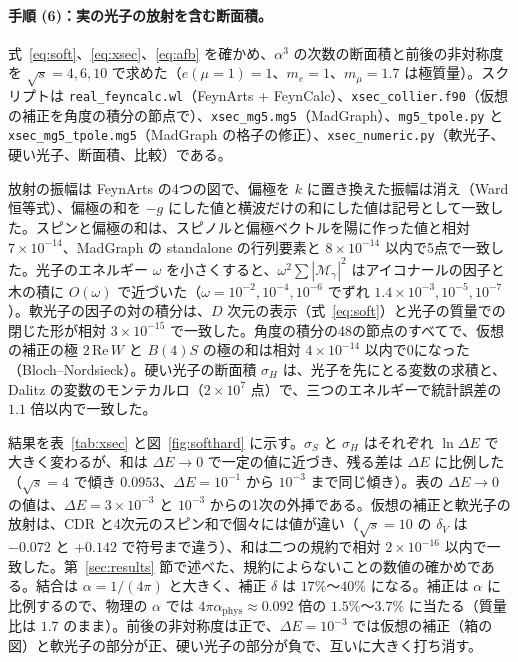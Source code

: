 \documentclass[a4paper,10pt]{ltjsarticle}
\begin{document}
\paragraph{手順 (6)：実の光子の放射を含む断面積。}式~\eqref{eq:soft}、\eqref{eq:xsec}、\eqref{eq:afb} を確かめ、$\alpha^3$ の次数の断面積と前後の非対称度を $\sqrt s=4,6,10$ で求めた（$e(\mu=1)=1$、$m_e=1$、$m_\mu=1.7$ は極質量）。スクリプトは \texttt{real\_feyncalc.wl}（FeynArts + FeynCalc）、\texttt{xsec\_collier.f90}（仮想の補正を角度の積分の節点で）、\texttt{xsec\_mg5.mg5}（MadGraph）、\texttt{mg5\_tpole.py} と \texttt{xsec\_mg5\_tpole.mg5}（MadGraph の格子の修正）、\texttt{xsec\_numeric.py}（軟光子、硬い光子、断面積、比較）である。

放射の振幅は FeynArts の4つの図で、偏極を $k$ に置き換えた振幅は消え（Ward 恒等式）、偏極の和を $-g$ にした値と横波だけの和にした値は記号として一致した。スピンと偏極の和は、スピノルと偏極ベクトルを陽に作った値と相対 $7\times10^{-14}$、MadGraph の standalone の行列要素と $8\times10^{-14}$ 以内で5点で一致した。光子のエネルギー $\omega$ を小さくすると、$\omega^2\sum|\mathcal M_\gamma|^2$ はアイコナールの因子と木の積に $O(\omega)$ で近づいた（$\omega=10^{-2},10^{-4},10^{-6}$ でずれ $1.4\times10^{-3},10^{-5},10^{-7}$）。軟光子の因子の対の積分は、$D$ 次元の表示（式~\eqref{eq:soft}）と光子の質量での閉じた形が相対 $3\times10^{-15}$ で一致した。角度の積分の48の節点のすべてで、仮想の補正の極 $2\,\mathrm{Re}\,W$ と $B(4)S$ の極の和は相対 $4\times10^{-14}$ 以内で0になった（Bloch--Nordsieck）。硬い光子の断面積 $\sigma_H$ は、光子を先にとる変数の求積と、Dalitz の変数のモンテカルロ（$2\times10^7$ 点）で、三つのエネルギーで統計誤差の $1.1$ 倍以内で一致した。

結果を表~\ref{tab:xsec} と図~\ref{fig:softhard} に示す。$\sigma_S$ と $\sigma_H$ はそれぞれ $\ln\Delta E$ で大きく変わるが、和は $\Delta E\to0$ で一定の値に近づき、残る差は $\Delta E$ に比例した（$\sqrt s=4$ で傾き $0.0953$、$\Delta E=10^{-1}$ から $10^{-3}$ まで同じ傾き）。表の $\Delta E\to0$ の値は、$\Delta E=3\times10^{-3}$ と $10^{-3}$ からの1次の外挿である。仮想の補正と軟光子の放射は、CDR と4次元のスピン和で個々には値が違い（$\sqrt s=10$ の $\delta_V$ は $-0.072$ と $+0.142$ で符号まで違う）、和は二つの規約で相対 $2\times10^{-16}$ 以内で一致した。第~\ref{sec:results} 節で述べた、規約によらないことの数値の確かめである。結合は $\alpha=1/(4\pi)$ と大きく、補正 $\delta$ は $17\%$〜$40\%$ になる。補正は $\alpha$ に比例するので、物理の $\alpha$ では $4\pi\alpha_{\mathrm{phys}}\approx0.092$ 倍の $1.5\%$〜$3.7\%$ に当たる（質量比は $1.7$ のまま）。前後の非対称度は正で、$\Delta E=10^{-3}$ では仮想の補正（箱の図）と軟光子の部分が正、硬い光子の部分が負で、互いに大きく打ち消す。
\end{document}
